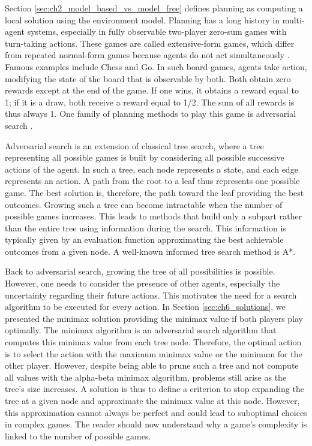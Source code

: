 Section \ref{sec:ch2_model_based_vs_model_free} defines planning as computing a local solution using the environment model.
Planning has a long history in multi-agent systems, especially in fully observable two-player zero-sum games with turn-taking actions.
These games are called extensive-form games, which differ from repeated normal-form games because agents do not act simultaneously \citep{Nowe2012GTMARL}.
Famous examples include Chess and Go.
In such board games, agents take action, modifying the state of the board that is observable by both.
Both obtain zero rewards except at the end of the game.
If one wins, it obtains a reward equal to 1; if it is a draw, both receive a reward equal to 1/2.
The sum of all rewards is thus always 1.
One family of planning methods to play this game is adversarial search \citep{russel2010}.

Adversarial search is an extension of classical tree search, where a tree representing all possible games is built by considering all possible successive actions of the agent.
In such a tree, each node represents a state, and each edge represents an action. 
A path from the root to a leaf thus represents one possible game.
The best solution is, therefore, the path toward the leaf providing the best outcomes.
Growing such a tree can become intractable when the number of possible games increases.
This leads to methods that build only a subpart rather than the entire tree using information during the search.
This information is typically given by an evaluation function approximating the best achievable outcomes from a given node.
A well-known informed tree search method is A*.

Back to adversarial search, growing the tree of all possibilities is possible.
However, one needs to consider the presence of other agents, especially the uncertainty regarding their future actions.
This motivates the need for a search algorithm to be executed for every action.
In Section \ref{sec:ch6_solutions}, we presented the minimax solution providing the minimax value if both players play optimally.
The minimax algorithm is an adversarial search algorithm that computes this minimax value from each tree node.
Therefore, the optimal action is to select the action with the maximum minimax value or the minimum for the other player.
However, despite being able to prune such a tree and not compute all values with the alpha-beta minimax algorithm, problems still arise as the tree's size increases.
A solution is thus to define a criterion to stop expanding the tree at a given node and approximate the minimax value at this node.
However, this approximation cannot always be perfect and could lead to suboptimal choices in complex games.
The reader should now understand why a game's complexity is linked to the number of possible games.

